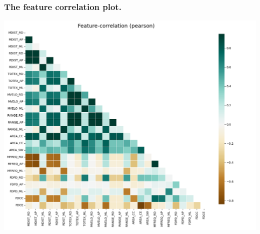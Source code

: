 \documentclass{beamer}
\begin{document}
\begin{frame}
\frametitle{The feature correlation plot.}
\centering
\includegraphics[scale=0.3]{Manuscripts/src/figures/corr_plot.png}
\end{frame}




    



\end{document}
